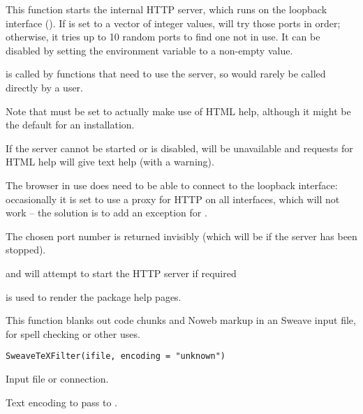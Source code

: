 \begin{Details}\relax
This function starts the internal HTTP server, which runs on the
loopback interface ().  If 
is set to a vector of integer values,  will try
those ports in order; otherwise, it tries up to 10 random ports to
find one not in use.  It can be disabled by setting the environment
variable  to a non-empty value.

 is called by functions that need to use the
server, so would rarely be called directly by a user.

Note that  must be set to actually make use
of HTML help, although it might be the default for an \R{} installation.

If the server cannot be started or is disabled,
 will be unavailable and requests for HTML
help will give text help (with a warning).

The browser in use does need to be able to connect to the loopback
interface: occasionally it is set to use a proxy for HTTP on all
interfaces, which will not work -- the solution is to add an exception
for .
\end{Details}
%
\begin{Value}
The chosen port number is returned invisibly (which will be 
if the server has been stopped).
\end{Value}
%
\begin{SeeAlso}\relax
{} and 
will attempt to start the HTTP server if required

 is used to render the package help pages.
\end{SeeAlso}
%
\begin{Description}\relax
This function blanks out code chunks and Noweb markup in an Sweave input file, 
for spell checking or other uses.
\end{Description}
%
\begin{Usage}
\begin{verbatim}
SweaveTeXFilter(ifile, encoding = "unknown")
\end{verbatim}
\end{Usage}
%
\begin{Arguments}
\begin{ldescription}
\item[\code{ifile}] 
Input file or connection.

\item[\code{encoding}] 
Text encoding to pass to .

\end{ldescription}
\end{Arguments}
